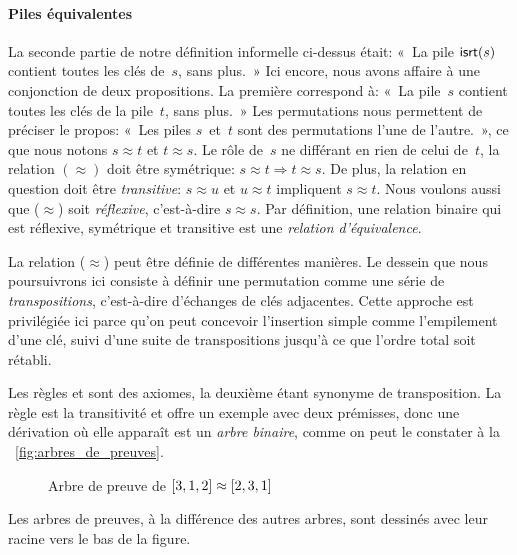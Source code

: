 \paragraph{Piles équivalentes}

La seconde partie de notre définition informelle ci-dessus était: «~La
pile \(\textsf{isrt}(s)\) contient toutes les
clés de~\(s\), sans plus.~» Ici encore, nous avons affaire à une
conjonction de deux propositions. La première correspond à: «~La
pile~\(s\) contient toutes les clés de la pile~\(t\), sans plus.~» Les
permutations nous permettent de préciser le propos: «~Les piles
\(s\)~et~\(t\) sont des permutations l'une de l'autre.~», ce que nous
notons \(s \approx t\) et \(t \approx s\). Le rôle de~\(s\) ne
différant en rien de celui de~\(t\), la relation \((\approx)\) doit
être symétrique: \(s \approx t \Rightarrow t \approx s\). De plus, la
relation en question doit être \emph{transitive}: \(s \approx u\) et
\(u \approx t\) impliquent \(s \approx t\). Nous voulons aussi que
(\(\approx\)) soit \emph{réflexive}, c'est-à-dire \(s \approx s\). Par
définition, une relation binaire qui est réflexive, symétrique et
transitive est une \emph{relation
  d'équivalence}.

La relation (\(\approx\)) peut être définie de différentes
manières. Le dessein que nous poursuivrons ici consiste à définir une
permutation comme une série de
\emph{transpositions}, c'est-à-dire d'échanges de
clés adjacentes. Cette approche est privilégiée ici parce qu'on peut
concevoir l'insertion simple comme l'empilement d'une clé, suivi d'une
suite de transpositions jusqu'à ce que l'ordre total soit rétabli.
Les règles  et  sont des axiomes, la
deuxième étant synonyme de transposition. La règle  est
la transitivité et offre un exemple avec deux prémisses, donc une
dérivation où elle apparaît est un \emph{arbre
  binaire}, comme on peut le constater à la
\fig~\vref{fig:arbres_de_preuves}.
\begin{figure}
\centering
{}
\qquad
{}
\caption{Arbre de preuve de \({[}3,1,2{]} \protect\approx {[}2,3,1{]}\)}
\label{fig:arbres_de_preuves}
\end{figure}
Les arbres de preuves, à la différence
des autres arbres, sont dessinés avec leur racine vers le bas de la
figure.


